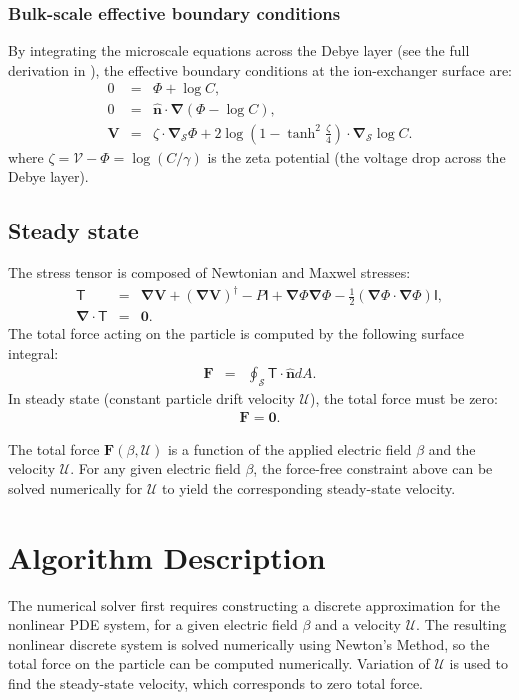 \documentclass[final]{elsarticle}
\newcommand{\pars}[1]{\left(#1\right)}
\newcommand\bnabla{\boldsymbol{\nabla}}
\newcommand\bV{\boldsymbol{V}}
\newcommand\bF{\boldsymbol{F}}
\newcommand\bnhat{\hat{\boldsymbol{n}}}
\newcommand\bzero{\boldsymbol{0}}
\newcommand\cU{\mathscr{U}}
\newcommand\cV{\mathscr{V}}
\newcommand\tI{\mathsf{I}}
\newcommand\tT{\mathsf{T}}
\begin{document}
\subsubsection{Bulk-scale effective boundary conditions}
By integrating the microscale equations across the Debye layer
(see the full derivation in \cite{yariv2010asymptotic}), 
the effective boundary conditions at the ion-exchanger surface are:
\begin{eqnarray*}
0 &=& \varPhi + \log C, \\
0 &=& \bnhat \cdot \bnabla \pars{\varPhi - \log C}, \\
\bV &=& 
\zeta \cdot \bnabla_\mathcal{S} \varPhi 
+ 2\log\pars{1-\tanh^2\frac{\zeta}{4}} \cdot \bnabla_\mathcal{S} \log C.
\end{eqnarray*}
where $\zeta = \cV - \varPhi = \log (C / \gamma)$ 
is the zeta potential (the voltage drop across the Debye layer).

\subsection{Steady state}
The stress tensor is composed of Newtonian and Maxwel stresses:
\begin{eqnarray*}
\tT &=& \bnabla \bV + (\bnabla \bV)^\dagger - P \tI
+ \bnabla \varPhi \bnabla \varPhi - \frac{1}{2} (\bnabla \varPhi \cdot \bnabla \varPhi) \tI, \\
\bnabla \cdot \tT &=& \bzero.
\end{eqnarray*}
The total force acting on the particle is computed by the following surface integral:
\begin{eqnarray*}
\bF &=& \oint_\mathcal{S} \tT \cdot \bnhat dA.
\end{eqnarray*}
In steady state (constant particle drift velocity $\cU$), 
the total force must be zero: 
\begin{eqnarray*}
\bF = \bzero.
\end{eqnarray*}

The total force $\bF(\beta, \cU)$ is a function of the applied electric field $\beta$ and
the velocity $\cU$.
For any given electric field $\beta$, the force-free constraint above 
can be solved numerically for $\cU$ to yield the corresponding steady-state velocity.

\section{Algorithm Description} \label{sec:algorithm}
The numerical solver first requires constructing a discrete 
approximation for the nonlinear PDE system,
for a given electric field $\beta$ and a velocity $\cU$. 
The resulting nonlinear discrete system is
solved numerically using Newton's Method, so the total force on the particle can be computed
numerically. Variation of $\cU$ is used to find the steady-state velocity, 
which corresponds to zero total force.
\end{document}
